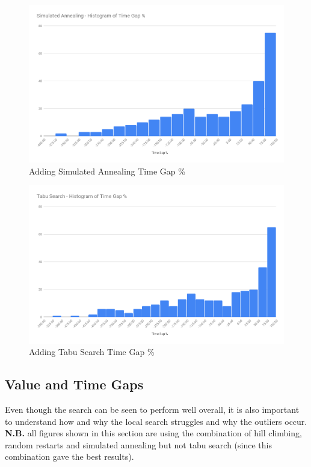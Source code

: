 \begin{figure}[!htbp]
    \centering
    \includegraphics[width=\textwidth]{Figures/Metaheuristics/annealing_time_gap.png}
    \caption{Adding Simulated Annealing Time Gap \%}
    \label{fig:time_gap_perc_annealing}
\end{figure}

\begin{figure}[!htbp]
    \centering
    \includegraphics[width=\textwidth]{Figures/Metaheuristics/tabu_time_gap.png}
    \caption{Adding Tabu Search Time Gap \%}
    \label{fig:time_gap_perc_tabu}
\end{figure}

\FloatBarrier

\subsection{Value and Time Gaps}

Even though the search can be seen to perform well overall, it is also important to understand how and why the local search struggles and why the outliers occur. \textbf{N.B.} all figures shown in this section are using the combination of hill climbing, random restarts and simulated annealing but not tabu search (since this combination gave the best results).

